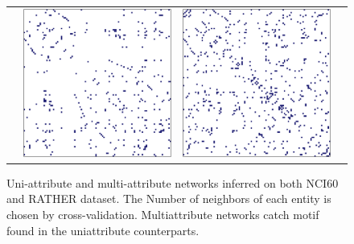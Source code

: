 \begin{figure}[htbp!]
\begin{tabular}{@{}lccc@{}}
    & \includegraphics[width=.3\textwidth]{figures/exprNet_RATHER}
    & \includegraphics[width=.3\textwidth]{figures/bivarNet_RATHER} \\
  \end{tabular}
  \caption{Uni-attribute and multi-attribute networks inferred on both
    NCI60 and RATHER dataset. The Number of neighbors of each entity
    is chosen by cross-validation. Multiattribute networks catch motif
    found in the uniattribute counterparts.}
  \label{fig:networks}
\end{figure}



